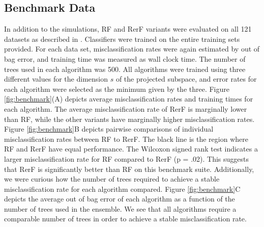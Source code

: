 \documentclass{article} %
\begin{document}

\subsection{Benchmark Data}

In addition to the simulations, RF and RerF variants were evaluated on all 121 datasets as described in \cite{Delgado2014}. Classifiers were trained on the entire training sets provided. For each data set, misclassification rates were again estimated by out of bag error, and training time was measured as wall clock time. The number of trees used in each algorithm was 500. All algorithms were trained using three different values for the dimension $s$ of the projected subspace, and error rates for each algorithm were selected as the minimum given by the three.  Figure \ref{fig:benchmark}(A) depicts average misclassification rates and training times for each algorithm. The average misclassification rate of RerF  is marginally lower than RF, while the other variants have marginally higher misclassification rates.  Figure \ref{fig:benchmark}B depicts pairwise comparisons of individual misclassification rates between RF to RerF. The black line is the region where RF and RerF have equal performance. The Wilcoxon signed rank test indicates a larger misclassification rate for RF compared to RerF (p = .02). This suggests that RerF is significantly better than RF on this benchmark suite.  Additionally, we were curious how the number of trees required to achieve a stable misclassification rate for each algorithm compared. Figure \ref{fig:benchmark}C depicts the average out of bag error of each algorithm as a function of the number of trees used in the ensemble. We see that all algorithms require a comparable number of trees in order to achieve a stable misclassification rate.
\end{document}
